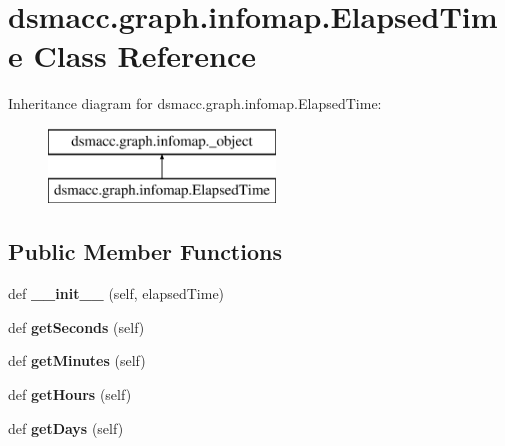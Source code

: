 \hypertarget{classdsmacc_1_1graph_1_1infomap_1_1ElapsedTime}{}\section{dsmacc.\+graph.\+infomap.\+Elapsed\+Time Class Reference}
\label{classdsmacc_1_1graph_1_1infomap_1_1ElapsedTime}
Inheritance diagram for dsmacc.\+graph.\+infomap.\+Elapsed\+Time\+:\begin{figure}[H]
\begin{center}
\leavevmode
\includegraphics[height=2.000000cm]{classdsmacc_1_1graph_1_1infomap_1_1ElapsedTime}
\end{center}
\end{figure}
\subsection*{Public Member Functions}
\begin{DoxyCompactItemize}
\item 
\mbox{\label{classdsmacc_1_1graph_1_1infomap_1_1ElapsedTime_a7f46d68c7a595e1ae467f5e02ed3ed7b}} 
def {\bfseries \+\_\+\+\_\+init\+\_\+\+\_\+} (self, elapsed\+Time)
\item 
\mbox{\label{classdsmacc_1_1graph_1_1infomap_1_1ElapsedTime_a9942f3b92aaeebf76c2a18a149a3efae}} 
def {\bfseries get\+Seconds} (self)
\item 
\mbox{\label{classdsmacc_1_1graph_1_1infomap_1_1ElapsedTime_a2f930dc6eb68b3341a3d02e3eaf5c146}} 
def {\bfseries get\+Minutes} (self)
\item 
\mbox{\label{classdsmacc_1_1graph_1_1infomap_1_1ElapsedTime_a56497b8dda473601f2a32ddef4560015}} 
def {\bfseries get\+Hours} (self)
\item 
\mbox{\label{classdsmacc_1_1graph_1_1infomap_1_1ElapsedTime_a0f02c04074859c947b3cf131d5c6826c}} 
def {\bfseries get\+Days} (self)
\end{DoxyCompactItemize}
